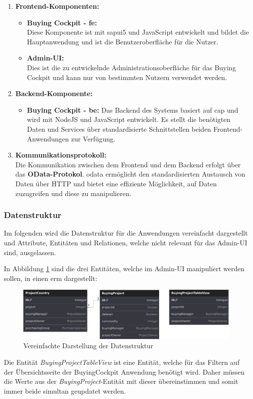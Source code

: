 \begin{enumerate}
    \item \textbf{Frontend-Komponenten:}
    \begin{itemize}
        \item \textbf{Buying Cockpit - \gls{fe}:} \\
        Diese Komponente ist mit \gls{sapui5} und JavaScript entwickelt und bildet die Hauptanwendung und ist die Benutzeroberfläche für die Nutzer.
        \item \textbf{Admin-UI:} \\
        Dies ist die zu entwickelnde Administrationsoberfläche für das Buying Cockpit und  kann nur von bestimmten Nutzern verwendet werden.
    \end{itemize} 
    \item \textbf{Backend-Komponente:}
    \begin{itemize}
        \item \textbf{Buying Cockpit - \gls{be}:}
        Das Backend des Systems basiert auf \gls{cap} und wird mit NodeJS und JavaScript entwickelt.
        Es stellt die benötigten Daten und Services über standardisierte Schnittstellen beiden Frontend-Anwendungen zur Verfügung.
    \end{itemize}
    \item \textbf{Kommunikationsprotokoll:} \\
    Die Kommunikation zwischen dem Frontend und dem Backend erfolgt über das \textbf{OData-Protokol}. 
    \gls{odata} ermöglicht den standardisierten Austausch von Daten über HTTP und bietet eine effiziente Möglichkeit, auf Daten zuzugreifen und diese zu manipulieren.
\end{enumerate}
\subsubsection[Datenstruktur]{Datenstruktur}
Im folgenden wird die Datenstruktur für die Anwendungen vereinfacht dargestellt und Attribute, Entitäten und Relationen, welche nicht relevant für das Admin-UI sind, ausgelassen.

In Abbildung \ref{fig:datastructure} sind die drei Entitäten, welche im Admin-UI manipuliert werden sollen, in einen \gls{erm} dargestellt: \\
\begin{figure}[H]
    \centering
    \includegraphics[width=\linewidth]{Images/Datenstruktur.png}
    \caption[Vereinfachte Darstellung der Datenstruktur]{Vereinfachte Darstellung der Datenstruktur}
    \label{fig:datastructure}
\end{figure}

Die Entität \textit{BuyingProjectTableView} ist eine Entität, welche für das Filtern auf der Übersichtsseite der BuyingCockpit Anwendung benötigt wird.
Daher müssen die Werte aus der \textit{BuyingProject}-Entität mit dieser übereinstimmen und somit immer beide simultan geupdatet werden.